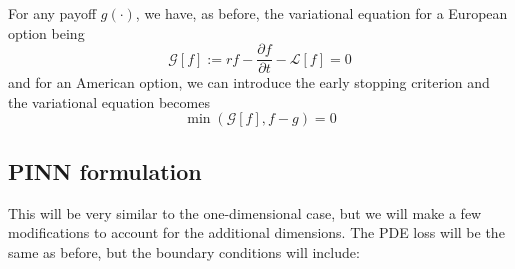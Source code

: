 For any payoff $g(\cdot)$, we have, as before, the variational equation for a European option being
\begin{equation}
\mathcal G[f] := rf - \frac{\partial f}{\partial t} - \mathcal L[f] = 0
\end{equation}
and for an American option, we can introduce the early stopping criterion and the variational equation becomes
\begin{equation}
\min (\mathcal G[f], f - g) = 0
\end{equation}

\subsection{PINN formulation}

This will be very similar to the one-dimensional case, but we will make a few modifications to account for the additional dimensions. The PDE loss will be the same as before, but the boundary conditions will include:

